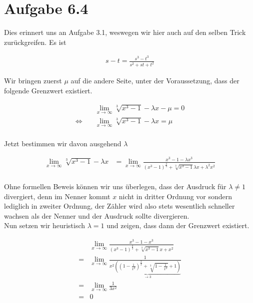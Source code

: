 \documentclass[a4paper,german,12pt,smallheadings]{scrartcl}
\begin{document}
\section*{Aufgabe 6.4}

Dies erinnert uns an Aufgabe 3.1, weswegen wir hier auch auf den selben Trick
zurückgreifen. Es ist

\begin{align*}
  s - t = \frac{s^3 - t^3}{s^2 + st + t^2}
\end{align*}

Wir bringen zuerst $\mu$ auf die andere Seite, unter der Voraussetzung, dass
der folgende Grenzwert existiert.

\begin{align*}
  &\lim_{x \to \infty} \sqrt[3]{x^3 - 1} - \lambda x - \mu = 0\\
  \Leftrightarrow\quad&\lim_{x \to \infty} \sqrt[3]{x^3 - 1} - \lambda x = \mu \\
\end{align*}

Jetzt bestimmen wir davon ausgehend $\lambda$

\begin{align*}
  \lim_{x \to \infty} \sqrt[3]{x^3 - 1} - \lambda x &= \lim_{x \to \infty} \frac{x^3 - 1 - \lambda x^3}{(x^3 - 1)^\frac{2}{3} + \sqrt[3]{x^3 - 1}\lambda x + \lambda^2 x^2} \\
\end{align*}

Ohne formellen Beweis können wir uns überlegen, dass der Ausdruck für $\lambda \neq 1$ divergiert, denn im Nenner kommt
$x$ nicht in dritter Ordnung vor sondern lediglich in zweiter Ordnung, der Zähler wird also stets wesentlich schneller wachsen als der Nenner und der Ausdruck sollte divergieren.\\

Nun setzen wir heuristisch $\lambda = 1$ und zeigen, dass dann der Grenzwert existiert.

\begin{align*}
  &\lim_{x \to \infty} \frac{x^3 - 1 - x^3}{(x^3 - 1)^\frac{2}{3} + \sqrt[3]{x^3 - 1}x + x^2} \\
  =&\lim_{x \to \infty} \frac{1}{x^2 \underbrace{\left(\left(1 - \frac{1}{x^3}\right)^\frac{2}{3} + \sqrt[3]{1 - \frac{1}{x^3}} + 1\right)}_{\to 3}} \\
  =&\lim_{x \to \infty} \frac{1}{3x^2} \\
  =& 0
\end{align*}
\end{document}
